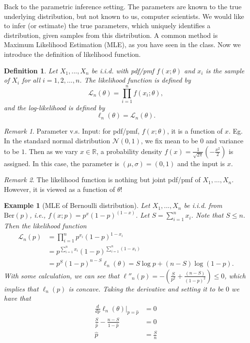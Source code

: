 \documentclass{article}
\newtheorem{definition}{Definition}
\newtheorem{example}{Example}
\DeclareMathOperator*{\1}{\mathbbm{1}}
\theoremstyle{definition}
\theoremstyle{remark}
\newtheorem{remark}{Remark}
\begin{document}
  Back to the parametric inference setting. The parameters are known to the true underlying distribution, but not known to us, computer scientists. We would like to infer (or estimate) the true parameters, which uniquely identifies a distribution, given samples from this distribution. A common method is Maximum Likelihood Estimation (MLE), as you have seen in the class. Now we introduce the definition of likelihood function.
  \begin{definition}
    Let $X_1,...,X_n$ be i.i.d. with pdf/pmf $f(x;\theta)$ and $x_i$ is the sample of $X_i$ for all $i=1,2,...,n$. The likelihood function is defined by 
    \begin{equation*}
      \mathcal L_n(\theta) = \prod_{i=1}^{n}f(x_i;\theta),
    \end{equation*}
    and the log-likelihood is defined by
    \begin{equation*}
      \ell_n(\theta) = \mathcal L_n(\theta).
    \end{equation*}
  \end{definition}
  \begin{remark}
    Parameter v.s. Input: for pdf/pmf, $f(x;\theta)$, it is a function of $x$. Eg. In the standard normal distribution $\mathcal N(0,1)$, we fix mean to be $0$ and variance to be $1$. Then as we vary $x\in \mathbb R$, a probability density $f(x) = \frac{1}{\sqrt{2\pi}}(-\frac{x^2}{2})$ is assigned. In this case, the parameter is $(\mu,\sigma)=(0,1)$ and the input is $x$.
  \end{remark}
  \begin{remark}
    The likelihood function is nothing but joint pdf/pmf of $X_1,...,X_n$. However, it is viewed as a function of $\theta$!
  \end{remark}
  \begin{example}[MLE of Bernoulli distribution]
    Let $X_1,...,X_n$ be i.i.d. from $\mathrm{Ber}(p)$, i.e., $f(x;p)=p^x(1-p)^{(1-x)}$. Let $S=\sum_{i=1}^n x_i$. Note that $S\le n$. Then the likelihood function
    \begin{align*}
      \mathcal L_n(p) &= \prod_{i=1}^{n}p^{x_i}(1-p)^{1-x_i}\\
      &= p^{\sum_{i=1}^n x_i}(1-p)^{\sum_{i=1}^n (1-x_i)}\\
      &=p^S(1-p)^{n-S}
      \ell_n(\theta) = S\log p + (n-S)\log(1-p).
    \end{align*}
    With some calculation, we can see that $\ell''_n(p) = -(\frac{S}{p^2}+\frac{(n-S)}{(1-p)^2})\le 0$, which implies that $\ell_n(p)$ is concave. Taking the derivative and setting it to be $0$ we have that
    \begin{align*}
      \frac{d}{dp}\ell_n(\theta)\Big |_{p=\hat p}&=0\\
      \frac{S}{\hat p}-\frac{n-S}{1-\hat p}&=0\\
      \hat p&=\frac{S}{n}
    \end{align*}
  \end{example}
\end{document}

